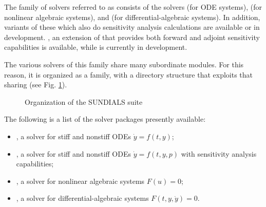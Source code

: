 %
The family of solvers referred to as {\sundials} consists of the solvers
{\cvode} (for ODE systems), {\kinsol} (for nonlinear algebraic
systems), and {\ida} (for differential-algebraic systems).  In addition,
variants of these which also do sensitivity analysis calculations are
available or in development. {\cvodes}, an extension of {\cvode} that
provides both forward and adjoint sensitivity capabilities is available,
while {\idas} is currently in development.

The various solvers of this family share many subordinate modules.
For this reason, it is organized as a family, with a directory
structure that exploits that sharing (see Fig. \ref{f:sunorg}).
\begin{figure}
\caption {Organization of the SUNDIALS suite}\label{f:sunorg}
\end{figure}
The following is a list of the solver packages presently available:
\begin{itemize}

\item {\cvode},  
  a solver for stiff and nonstiff ODEs $\dot y = f(t,y)$;

\item {\cvodes},
  a solver for stiff and nonstiff ODEs $\dot y = f(t,y,p)$
  with sensitivity analysis capabilities;

\item {\kinsol}, 
  a solver for nonlinear algebraic systems $F(u) = 0$;

\item {\ida},
  a solver for differential-algebraic systems $F(t,y,\dot y) = 0$.

\end{itemize}
